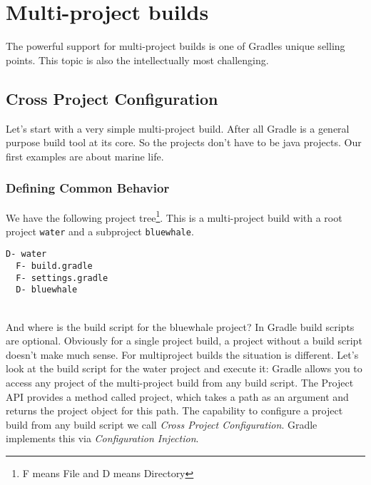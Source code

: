 \chapter{Multi-project builds} %
\label{cha:multi_project_builds}

The powerful support for multi-project builds is one of Gradles unique selling points. This topic is also the intellectually most challenging.
\section{Cross Project Configuration} %
\label{sec:cross_project_configuration}
Let's start with a very simple multi-project build. After all Gradle is a general purpose build tool at its core. So the projects don't have to be java projects. Our first examples are about marine life. 

\subsection{Defining Common Behavior} %
We have the following project tree\footnote{F means File and D means Directory}. This is a multi-project build with a root project \texttt{water} and a subproject \texttt{bluewhale}.

\begin{minipage}[t]{7cm}
\begin{Verbatim}[frame=single,label=Project Tree]
D- water
  F- build.gradle
  F- settings.gradle
  D- bluewhale	
\end{Verbatim}
\end{minipage}	
\begin{minipage}[t]{9cm}
\end{minipage}
\\

\noindent And where is the build script for the bluewhale project? In Gradle build scripts are optional. Obviously for a single project build, a project without a build script doesn't make much sense. For multiproject builds the situation is different. Let's look at the build script for the water project and execute it:
Gradle allows you to access any project of the multi-project build from any build script. The Project API provides a method called project, which takes a path as an argument and returns the project object for this path. The capability to configure a project build from any build script we call \emph{Cross Project Configuration}. Gradle implements this via \emph{Configuration Injection}.

